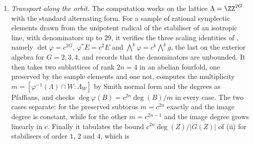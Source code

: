 \begin{enumerate}[label=\textup{(\Roman*)},leftmargin=*]
  $(F,n)$, with $m=2$ and $m=3$ and $n=1,2,3$. For each it checks that
  the CM type and its conjugate partition the embeddings, that
  $\zeta-\zeta^{-1}$ is totally imaginary, that the trace-dual bases satisfy
  $\sum_{k}\sigma(\omega_{k})\sigma'(\omega^{*}_{k})=\delta_{\sigma\sigma'}$
  over every pair of embeddings, that $V^{1,0}$ is half-dimensional and
  isotropic for $E=\Tr(\xi H)$ so that the point lies in the period domain,
  that every eigenspace meets $V^{1,0}$ in dimension $n$ so that the Weil
  classes are of type $(n,n)$, that
  $\delta_{i}(f)=\sum_{\sigma}\sigma(f)\,u_{i,\sigma}\wedge u_{i',\sigma}$
  and is therefore of type $(1,1)$, that every $\alpha_{\sigma}$ is nonzero,
  and that the balanced $n$-fold product of the $\delta_{i}$ is
  $w(f)=\sum_{\sigma}\sigma(f)\alpha_{\sigma}$, rational, spanning $W_{F}$.
  For $F=\QQ(\zeta_{5})$ at $n=2$ it also computes, in the exterior algebra of
  the sixteen-dimensional space, the space of rational $(1,1)$ classes, of
  dimension $32$, and records that the balanced sum is necessary: the plain
  product $\delta_{1}(1)\delta_{2}(1)$ is not a Weil class. Finally, for
  $F=\QQ(\zeta_{8})\supset K=\QQ(\sqrt{-1})$ it checks that each $K$-Weil class
  is the product of the two $F$-Weil classes above it and that $W_{K}$ lies in
  the span of the products of pairs from $W_{F}$, which is
  .
\item \emph{Transport along the orbit.} The computation works on the
  lattice $\Lambda=\ZZ^{2G}$ with the standard alternating form. For a sample
  of rational symplectic elements drawn from the unipotent radical of the
  stabiliser of an isotropic line, with denominators up to $29$, it verifies
  the three scaling identities of , namely
  $\det\varphi=c^{2G}$, $\varphi^{*}E=c^{2}E$ and
  $\bigwedge^{k}\varphi=c^{k}\bigwedge^{k}g$, the last on the exterior
  algebra for $G=2,3,4$, and records that the denominators are unbounded. It
  then takes two sublattices of rank $2n=4$ in an abelian fourfold, one
  preserved by the sample elements and one not, computes the multiplicity
  $m=[\varphi^{-1}(\Lambda)\cap W:\Lambda_{W}]$ by Smith normal form and the
  degrees as Pfaffians, and checks
  $\deg\varphi(B)=c^{2n}\deg(B)/m$ in every case. The two cases separate: for
  the preserved subtorus $m=c^{2n}$ exactly and the image degree is constant,
  while for the other $m=c^{2n-1}$ and the image degree grows linearly in $c$.
  Finally it tabulates the bound $c^{2n}\deg(Z)/|G(Z)|$ of
  (ii) for stabilisers of order $1$, $2$ and $4$, which is

\end{enumerate}
